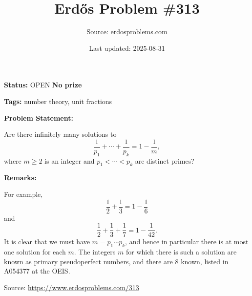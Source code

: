 \documentclass{article}
\title{Erd\H{o}s Problem \#313}
\date{Last updated: 2025-08-31}
\author{Source: erdosproblems.com}
\begin{document}
\maketitle

\noindent\textbf{Status:} OPEN \quad \textbf{No prize}

\noindent\textbf{Tags:} number theory, unit fractions

\medskip
\noindent\textbf{Problem Statement:}

Are there infinitely many solutions to\[\frac{1}{p_1}+\cdots+\frac{1}{p_k}=1-\frac{1}{m},\]where $m\geq 2$ is an integer and $p_1<\cdots<p_k$ are distinct primes?

\bigskip
\noindent\textbf{Remarks:}

For example,\[\frac{1}{2}+\frac{1}{3}=1-\frac{1}{6}\]and\[\frac{1}{2}+\frac{1}{3}+\frac{1}{7}=1-\frac{1}{42}.\]It is clear that we must have $m=p_1\cdots p_k$, and hence in particular there is at most one solution for each $m$. The integers $m$ for which there is such a solution are known as primary pseudoperfect numbers, and there are $8$ known, listed in A054377 at the OEIS.

\bigskip
\noindent\small{Source: \url{https://www.erdosproblems.com/313}}
\end{document}
